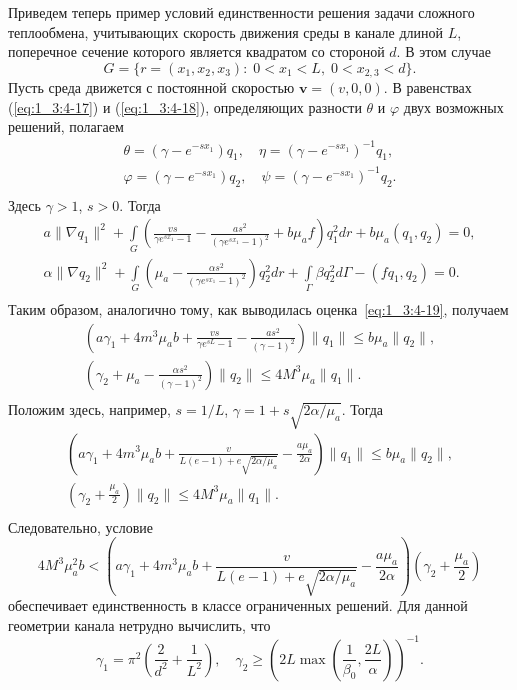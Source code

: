 Приведем теперь пример условий единственности решения задачи
сложного теплообмена, учитывающих скорость движения среды в канале
длиной $L$, поперечное сечение которого является квадратом со
стороной $d$.
В этом случае
\begin{equation}
    \label{eq:1_3:4-21}
    G= \{r=(x_1, x_2, x_3): \; 0 < x_1 < L, \; 0 < x_{2,3} < d \}.
\end{equation}
Пусть среда движется с постоянной скоростью $\textbf{v} = (v, 0,
0)$.
В равенствах (\ref{eq:1_3:4-17}) и (\ref{eq:1_3:4-18}), определяющих
разности $\theta$ и $\varphi$ двух возможных решений, полагаем
\begin{gather*}
    \theta = (\gamma- e^{-sx_1})q_1, \quad \eta = (\gamma-
    e^{-sx_1})^{-1}q_1,\\
    \varphi = (\gamma- e^{-sx_1})q_2, \quad \psi = (\gamma-
    e^{-sx_1})^{-1}q_2.\\
\end{gather*}
Здесь $\gamma > 1$, $s > 0$.
Тогда
\begin{gather*}
    a\|\nabla q_1\|^2 + \int \limits_G \left(\frac{vs}{\gamma
    e^{sx_1}-1} - \frac{as^2}{(\gamma e^{sx_1}-1)^2} + b\mu_a
    f\right)q_1^2 dr + b\mu_a(q_1, q_2)=0,\\
    \alpha\|\nabla q_2\|^2 + \int \limits_G \left(\mu_a - \frac{\alpha
    s^2}{(\gamma e^{sx_1}-1)^2}\right)q_2^2 dr + \int \limits_{\Gamma}
    \beta q_2^2 d\Gamma - (f q_1, q_2)=0.\\
\end{gather*}
Таким образом, аналогично тому,
как выводилась оценка~\eqref{eq:1_3:4-19}, получаем
\begin{gather*}
    \left(a\gamma_1+4m^3\mu_a b + \frac{vs}{\gamma e^{sL}-1} -
    \frac{as^2}{(\gamma-1)^2}\right)\|q_1\| \leq b\mu_a\|q_2\|,\\
    \left(\gamma_2+\mu_a - \frac{\alpha
    s^2}{(\gamma-1)^2}\right)\|q_2\| \leq 4M^3\mu_a\|q_1\|.\\
\end{gather*}
Положим здесь, например, $s=1/L$,
$\gamma=1+s\sqrt{2\alpha/\mu_a}$.
Тогда
\begin{gather*}
    \left(a\gamma_1+4m^3\mu_a b +
    \frac{v}{L(e-1)+e\sqrt{2\alpha/\mu_a}} -
    \frac{a\mu_a}{2\alpha}\right)\|q_1\| \leq b\mu_a\|q_2\|,\\
    \left(\gamma_2+ \frac{\mu_a}{2}\right)\|q_2\| \leq
    4M^3\mu_a\|q_1\|.\\
\end{gather*}
Следовательно, условие
\begin{equation}
    \label{eq:1_3:4-22}
    4M^3\mu_a^2 b < \left(a\gamma_1 + 4m^3\mu_a b +
    \frac{v}{L(e-1)+e\sqrt{2\alpha/\mu_a}}-
    \frac{a\mu_a}{2\alpha}\right)\left(\gamma_2+\frac{\mu_a}{2}\right)
\end{equation}
обеспечивает единственность в классе ограниченных решений.
Для
данной геометрии канала нетрудно вычислить, что
\[
    \gamma_1 = \pi^2\left(\frac{2}{d^2} + \frac{1}{L^2}\right), \quad
    \gamma_2 \geq
    \left(2L\max\left(\frac{1}{\beta_0},\frac{2L}{\alpha}\right)\right)^{-1}.
\]



